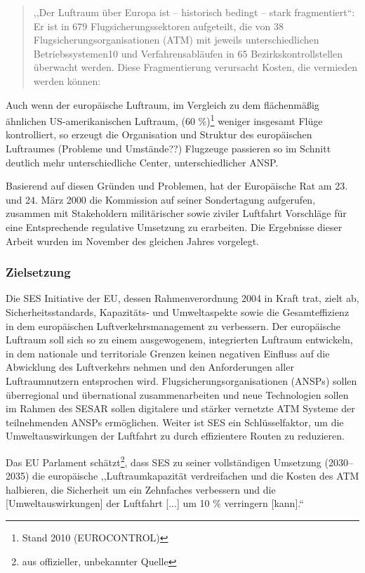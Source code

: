 
\begin{quote}
,,Der Luftraum über Europa ist – historisch bedingt – stark fragmentiert``:  Er ist in 679 Flugsicherungssektoren aufgeteilt, die von 38 Flugsicherungsorganisationen (ATM) mit jeweils unterschiedlichen
Betriebssystemen10 und Verfahrensabläufen in 65 Bezirkskontrollstellen überwacht werden. Diese Fragmentierung verursacht Kosten, die vermieden werden können:
\cite[S.6]{eu_ses_studie} 
\end{quote}

\noindent
Auch wenn der europäische Luftraum, im Vergleich zu dem flächenmäßig ähnlichen US-amerikanischen Luftraum, (60 \%)\footnote{Stand 2010 (EUROCONTROL)} weniger insgesamt Flüge kontrolliert, so erzeugt die Organisation und Struktur des europäischen Luftraumes (Probleme und Umstände??)
Flugzeuge passieren so im Schnitt deutlich mehr unterschiedliche Center, unterschiedlicher ANSP. 
\cite[S. 74]{eu_ses_fab}

Basierend auf diesen Gründen und Problemen, hat der Europäische Rat am 23. und 24. März 2000 die Kommission auf seiner Sondertagung aufgerufen, zusammen mit Stakeholdern militärischer sowie ziviler Luftfahrt Vorschläge für eine Entsprechende regulative Umsetzung zu erarbeiten.
Die Ergebnisse dieser Arbeit wurden im November des gleichen Jahres vorgelegt.
\cite[ErwG. 2]{2004R0549}

\subsubsection{Zielsetzung}

Die \acf{SES} Initiative der \acf{EU}, dessen Rahmenverordnung 2004 in Kraft trat, zielt ab, Sicherheitsstandards, Ka\-pazitäts- und Umweltaspekte sowie die Gesamteffizienz in dem europäischen Luftverkehrsmanagement zu verbessern.
Der europäische Luftraum soll sich so zu einem ausgewogenem, integrierten Luftraum entwickeln, in dem nationale und territoriale Grenzen keinen negativen Einfluss auf die Abwicklung des Luftverkehrs nehmen und den Anforderungen aller Luftraumnutzern entsprochen wird. \cite[Art. 1 Abs. 1]{2004R0549}
Flugsicherungsorganisationen (\acsp{ANSP}) sollen überregional und übernational zusammenarbeiten und neue Technologien sollen im Rahmen des \acf{SESAR} sollen digitalere und stärker vernetzte \acs{ATM} Systeme der teilnehmenden \acp{ANSP} ermöglichen.
Weiter ist \acs{SES} ein Schlüsselfaktor, um die Umweltauswirkungen der Luftfahrt zu durch effizientere Routen zu reduzieren.  

Das \acs{EU} Parlament schätzt\footnote{aus offizieller, unbekannter Quelle}, dass \ac{SES} zu seiner vollständigen Umsetzung (2030--2035) die europäische ,,Luftraumkapazität verdreifachen und die Kosten des \ac{ATM} halbieren, die Sicherheit um ein Zehnfaches verbessern und die [Umweltauswirkungen] der Luftfahrt [...] um 10 \% verringern [kann].`` 
\cite{eu_parl_ses} 



